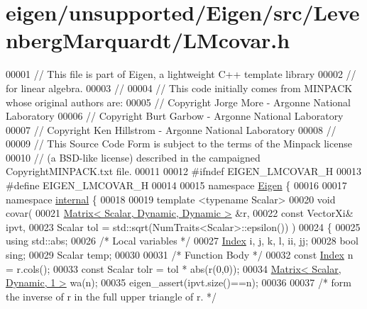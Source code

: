 \hypertarget{eigen_2unsupported_2_eigen_2src_2_levenberg_marquardt_2_l_mcovar_8h_source}{}\section{eigen/unsupported/\+Eigen/src/\+Levenberg\+Marquardt/\+L\+Mcovar.h}
\label{eigen_2unsupported_2_eigen_2src_2_levenberg_marquardt_2_l_mcovar_8h_source}

\begin{DoxyCode}
00001 \textcolor{comment}{// This file is part of Eigen, a lightweight C++ template library}
00002 \textcolor{comment}{// for linear algebra.}
00003 \textcolor{comment}{//}
00004 \textcolor{comment}{// This code initially comes from MINPACK whose original authors are:}
00005 \textcolor{comment}{// Copyright Jorge More - Argonne National Laboratory}
00006 \textcolor{comment}{// Copyright Burt Garbow - Argonne National Laboratory}
00007 \textcolor{comment}{// Copyright Ken Hillstrom - Argonne National Laboratory}
00008 \textcolor{comment}{//}
00009 \textcolor{comment}{// This Source Code Form is subject to the terms of the Minpack license}
00010 \textcolor{comment}{// (a BSD-like license) described in the campaigned CopyrightMINPACK.txt file.}
00011 
00012 \textcolor{preprocessor}{#ifndef EIGEN\_LMCOVAR\_H}
00013 \textcolor{preprocessor}{#define EIGEN\_LMCOVAR\_H}
00014 
00015 \textcolor{keyword}{namespace }\hyperlink{namespace_eigen}{Eigen} \{ 
00016 
00017 \textcolor{keyword}{namespace }\hyperlink{namespaceinternal}{internal} \{
00018 
00019 \textcolor{keyword}{template} <\textcolor{keyword}{typename} Scalar>
00020 \textcolor{keywordtype}{void} covar(
00021         \hyperlink{group___core___module}{Matrix< Scalar, Dynamic, Dynamic >} &r,
00022         \textcolor{keyword}{const} VectorXi& ipvt,
00023         Scalar tol = std::sqrt(NumTraits<Scalar>::epsilon()) )
00024 \{
00025     \textcolor{keyword}{using} std::abs;
00026     \textcolor{comment}{/* Local variables */}
00027     \hyperlink{namespace_eigen_a62e77e0933482dafde8fe197d9a2cfde}{Index} i, j, k, l, ii, jj;
00028     \textcolor{keywordtype}{bool} sing;
00029     Scalar temp;
00030 
00031     \textcolor{comment}{/* Function Body */}
00032     \textcolor{keyword}{const} \hyperlink{namespace_eigen_a62e77e0933482dafde8fe197d9a2cfde}{Index} n = r.cols();
00033     \textcolor{keyword}{const} Scalar tolr = tol * abs(r(0,0));
00034     \hyperlink{group___core___module}{Matrix< Scalar, Dynamic, 1 >} wa(n);
00035     eigen\_assert(ipvt.size()==n);
00036 
00037     \textcolor{comment}{/* form the inverse of r in the full upper triangle of r. */}

\end{DoxyCode}
